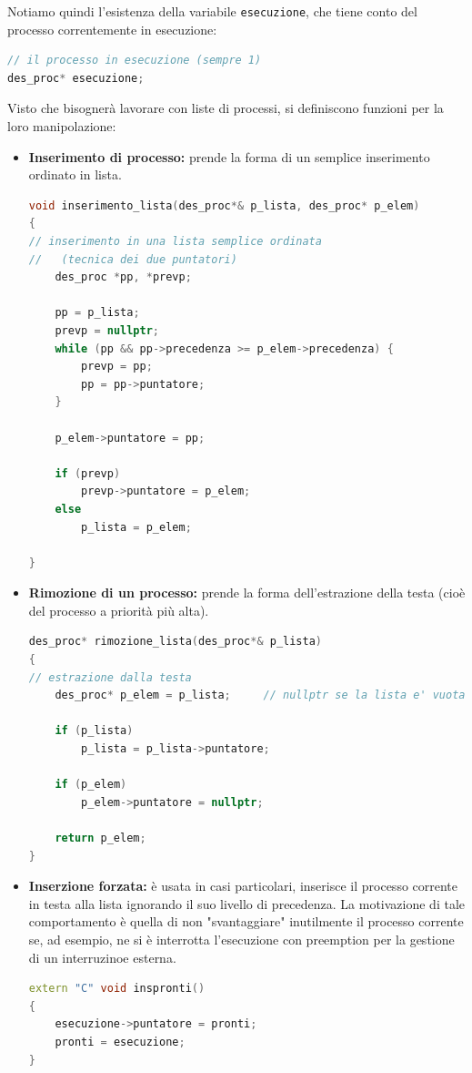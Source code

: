 \documentclass[a4paper,11pt]{article}
\begin{document}
Notiamo quindi l'esistenza della variabile \lstinline|esecuzione|, che tiene conto del processo correntemente in esecuzione:
\begin{lstlisting}[language=C++, style=codestyle]	
// il processo in esecuzione (sempre 1)
des_proc* esecuzione;
\end{lstlisting}

Visto che bisognerà lavorare con liste di processi, si definiscono funzioni per la loro manipolazione:
\begin{itemize}
	\item \textbf{Inserimento di processo:} prende la forma di un semplice inserimento ordinato in lista.
\begin{lstlisting}[language=C++, style=codestyle]	
void inserimento_lista(des_proc*& p_lista, des_proc* p_elem)
{
// inserimento in una lista semplice ordinata
//   (tecnica dei due puntatori)
	des_proc *pp, *prevp;

	pp = p_lista;
	prevp = nullptr;
	while (pp && pp->precedenza >= p_elem->precedenza) {
		prevp = pp;
		pp = pp->puntatore;
	}

	p_elem->puntatore = pp;

	if (prevp)
		prevp->puntatore = p_elem;
	else
		p_lista = p_elem;

}
\end{lstlisting}
	\item \textbf{Rimozione di un processo:} prende la forma dell'estrazione della testa (cioè del processo a priorità più alta).
\begin{lstlisting}[language=C++, style=codestyle]	
des_proc* rimozione_lista(des_proc*& p_lista)
{
// estrazione dalla testa
	des_proc* p_elem = p_lista;  	// nullptr se la lista e' vuota

	if (p_lista)
		p_lista = p_lista->puntatore;

	if (p_elem)
		p_elem->puntatore = nullptr;

	return p_elem;
}
\end{lstlisting}
\item \textbf{Inserzione forzata:} è usata in casi particolari, inserisce il processo corrente in testa alla lista ignorando il suo livello di precedenza.
	La motivazione di tale comportamento è quella di non "svantaggiare" inutilmente il processo corrente se, ad esempio, ne si è interrotta l'esecuzione con preemption per la gestione di un interruzinoe esterna.
\begin{lstlisting}[language=C++, style=codestyle]	
extern "C" void inspronti()
{
	esecuzione->puntatore = pronti;
	pronti = esecuzione;
}
\end{lstlisting}
\end{itemize}
\end{document}
